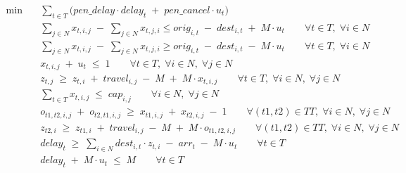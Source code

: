 \begin{align}
  \min\quad & \sum_{t \in T} \bigl( \mathit{pen\_delay} \cdot \mathit{delay}_{t} \;+\; \mathit{pen\_cancel} \cdot \mathit{u}_{t} \bigr) \tag{total\_cost} \\
  & \sum_{j \in N} x_{t,i,j} \;-\; \sum_{j \in N} x_{t,j,i}
      \le \mathit{orig}_{i,t} \;-\; \mathit{dest}_{i,t} \;+\; \mathit{M} \cdot \mathit{u}_{t}
      \qquad \forall t \in T,\; \forall i \in N \tag{flow\_up} \\
  & \sum_{j \in N} x_{t,i,j} \;-\; \sum_{j \in N} x_{t,j,i}
      \ge \mathit{orig}_{i,t} \;-\; \mathit{dest}_{i,t} \;-\; \mathit{M} \cdot \mathit{u}_{t}
      \qquad \forall t \in T,\; \forall i \in N \tag{flow\_low} \\
  & x_{t,i,j} \;+\; \mathit{u}_{t} \;\le\; 1
      \qquad \forall t \in T,\; \forall i \in N,\; \forall j \in N \tag{cancel\_link} \\
  & \mathit{z}_{t,j} \;\ge\; \mathit{z}_{t,i} \;+\; \mathit{travel}_{i,j} \;-\; \mathit{M} \;+\; \mathit{M} \cdot x_{t,i,j}
      \qquad \forall t \in T,\; \forall i \in N,\; \forall j \in N \tag{timing} \\
  & \sum_{t \in T} x_{t,i,j} \;\le\; \mathit{cap}_{i,j}
      \qquad \forall i \in N,\; \forall j \in N \tag{capacity} \\
  & \mathit{o}_{t1,t2,i,j} \;+\; \mathit{o}_{t2,t1,i,j}
      \;\ge\; x_{t1,i,j} \;+\; x_{t2,i,j} \;-\; 1
      \qquad \forall (t1,t2) \in TT,\; \forall i \in N,\; \forall j \in N \tag{order\_link} \\
  & \mathit{z}_{t2,i} \;\ge\; \mathit{z}_{t1,i} \;+\; \mathit{travel}_{i,j} \;-\; \mathit{M} \;+\; \mathit{M} \cdot \mathit{o}_{t1,t2,i,j}
      \qquad \forall (t1,t2) \in TT,\; \forall i \in N,\; \forall j \in N \tag{order\_time} \\
  & \mathit{delay}_{t} \;\ge\; \sum_{i \in N} \mathit{dest}_{i,t} \cdot \mathit{z}_{t,i} \;-\; \mathit{arr}_{t} \;-\; \mathit{M} \cdot \mathit{u}_{t}
      \qquad \forall t \in T \tag{delay\_low} \\
  & \mathit{delay}_{t} \;+\; \mathit{M} \cdot \mathit{u}_{t} \;\le\; \mathit{M}
      \qquad \forall t \in T \tag{delay\_up} \\
\end{align}